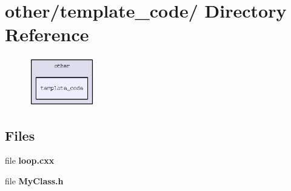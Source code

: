 \section{other/template\_\-code/ Directory Reference}
\label{dir_97f4f964a7c2b94ff9477b1e8e301978}


\begin{figure}[H]
\begin{center}
\leavevmode
\includegraphics[width=81pt]{dir_97f4f964a7c2b94ff9477b1e8e301978_dep}
\end{center}
\end{figure}
\subsection*{Files}
\begin{CompactItemize}
\item 
file \textbf{loop.cxx}
\item 
file \textbf{My\-Class.h}
\end{CompactItemize}
